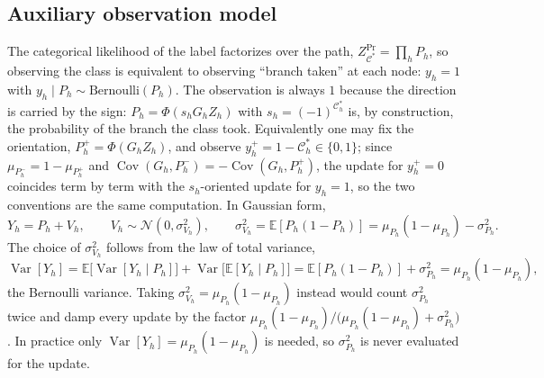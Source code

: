 \documentclass[letterpaper]{article}
\begin{document}
\subsection{Auxiliary observation model}
The categorical likelihood of the label factorizes over the path, $Z^{\Pr}_{\mathcal C^\ast}=\prod_hP_h$, so observing the class is equivalent to observing ``branch taken'' at each node: $y_h=1$ with $y_h\mid P_h\sim\mathrm{Bernoulli}(P_h)$. The observation is always $1$ because the direction is carried by the sign: $P_h=\Phi(s_hG_hZ_h)$ with $s_h=(-1)^{\mathcal C^\ast_h}$ is, by construction, the probability of the branch the class took. Equivalently one may fix the orientation, $P_h^{+}=\Phi(G_hZ_h)$, and observe $y_h^{+}=1-\mathcal C^\ast_h\in\{0,1\}$; since $\mu_{P_h^{-}}=1-\mu_{P_h^{+}}$ and $\operatorname{Cov}(G_h,P_h^{-})=-\operatorname{Cov}(G_h,P_h^{+})$, the update for $y_h^{+}=0$ coincides term by term with the $s_h$-oriented update for $y_h=1$, so the two conventions are the same computation. In Gaussian form,
\begin{equation}
Y_h=P_h+V_h,\qquad V_h\sim\mathcal N(0,\sigma^2_{V_h}),\qquad
\sigma^2_{V_h}=\mathbb E[P_h(1-P_h)]=\mu_{P_h}(1-\mu_{P_h})-\sigma^2_{P_h}.
\label{E:obs}
\end{equation}
The choice of $\sigma^2_{V_h}$ follows from the law of total variance,
\begin{equation}
\operatorname{Var}[Y_h]=\mathbb E\big[\operatorname{Var}[Y_h\mid P_h]\big]+\operatorname{Var}\big[\mathbb E[Y_h\mid P_h]\big]=\mathbb E[P_h(1-P_h)]+\sigma^2_{P_h}=\mu_{P_h}(1-\mu_{P_h}),
\end{equation}
the Bernoulli variance. Taking $\sigma^2_{V_h}=\mu_{P_h}(1-\mu_{P_h})$ instead would count $\sigma^2_{P_h}$ twice and damp every update by the factor $\mu_{P_h}(1-\mu_{P_h})/\big(\mu_{P_h}(1-\mu_{P_h})+\sigma^2_{P_h}\big)$. In practice only $\operatorname{Var}[Y_h]=\mu_{P_h}(1-\mu_{P_h})$ is needed, so $\sigma^2_{P_h}$ is never evaluated for the update.
\end{document}
